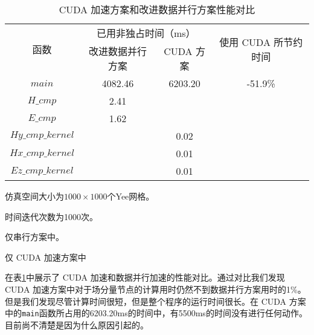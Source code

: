 \begin{table}[hp]
	\centering
	\caption{CUDA 加速方案和改进数据并行方案性能对比}\label{ch4: cuda or new}
\begin{threeparttable}
	\begin{tabular}{cccc}
		\toprule
		\multirow{2}{2em}{函数}&\multicolumn{2}{c}{已用非独占时间（ms）} & \multirow{2}{6em}{使用 CUDA 所节约时间}\\ 
		\cline{2-3}
		& 改进数据并行方案 & CUDA 方案 & \\ 
		
		\midrule
			$main$ & 4082.46 & 6203.20 & -51.9\% \\
			$H\_cmp$\tnote{3} & 2.41 &  & \\ 
			$E\_cmp$\tnote{3} & 1.62 &  & \\
			$Hy\_cmp\_kernel$\tnote{4} &  & 0.02 & \\ 
			$Hx\_cmp\_kernel$\tnote{4} &  & 0.01 & \\ 
			$Ez\_cmp\_kernel$\tnote{4} &  & 0.01 & \\
		\bottomrule
	\end{tabular}
	\begin{tablenotes}
		\item[1] 仿真空间大小为$1000\times1000$个Yee网格。
		\item[2] 时间迭代次数为1000次。
		\item[3] 仅串行方案中。
		\item[4] 仅 CUDA 加速方案中
	\end{tablenotes}
\end{threeparttable}
\end{table}

在表\ref{ch4: cuda or new}中展示了 CUDA 加速和数据并行加速的性能对比。通过对比我们发现 CUDA 加速方案中对于场分量节点的计算用时仍然不到数据并行方案用时的1\%。但是我们发现尽管计算时间很短，但是整个程序的运行时间很长。在 CUDA 方案中的\lstinline|main|函数所占用的6203.20ms的时间中，有5500ms的时间没有进行任何动作。目前尚不清楚是因为什么原因引起的。

